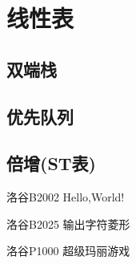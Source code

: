 \chapter{线性表}
\section{双端栈}
\section{优先队列}
\section{倍增(ST表)}


\begin{problemset}
\item 洛谷B2002 Hello,World!
\item 洛谷B2025 输出字符菱形
\item 洛谷P1000 超级玛丽游戏
\end{problemset}


